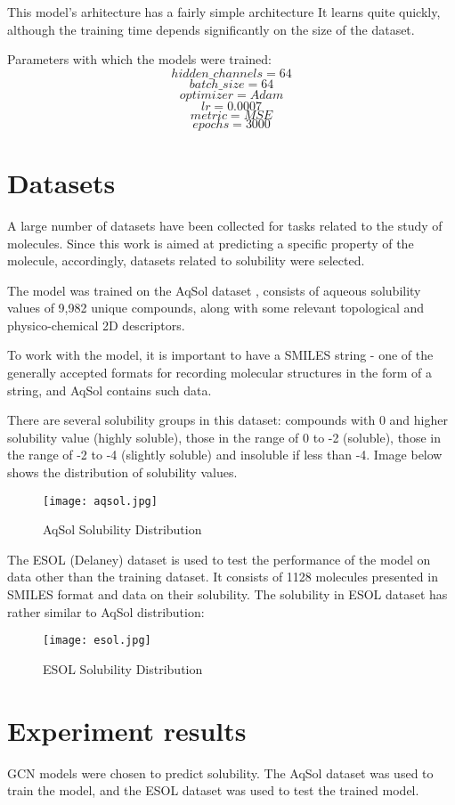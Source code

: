 \documentclass[a4paper,14pt]{article}
\begin{document}
This model's arhitecture has a fairly simple architecture It learns quite quickly, although the training time depends significantly on the size of the dataset.

Parameters with which the models were trained:
$$hidden\_channels = 64$$
$$batch\_size = 64$$
$$optimizer = Adam$$
$$lr = 0.0007$$
$$metric = MSE$$
$$epochs = 3000$$

\section{Datasets}
A large number of datasets have been collected for tasks related to the study of molecules. Since this work is aimed at predicting a specific property of the molecule, accordingly, datasets related to solubility were selected.

The model was trained on the AqSol dataset \cite{AqSol}, consists of aqueous solubility values of 9,982 unique compounds, along with some relevant topological and physico-chemical 2D descriptors. 

To work with the model, it is important to have a SMILES string - one of the generally accepted formats for recording molecular structures in the form of a string, and AqSol contains such data.

There are several solubility groups in this dataset: compounds with 0 and higher solubility value (highly soluble), those in the range of 0 to -2 (soluble), those in the range of -2 to -4 (slightly soluble) and insoluble if less than -4. Image below shows the distribution of solubility values.

\begin{figure}[H]
    \centering
    \texttt{[image: aqsol.jpg]}
    \caption{AqSol Solubility Distribution}
\end{figure}


The ESOL (Delaney) dataset \cite{ESOL} is used to test the performance of the model on data other than the training dataset. It consists of 1128 molecules presented in SMILES format and data on their solubility. The solubility in ESOL dataset has rather similar to AqSol distribution:

\begin{figure}[H]
    \centering
    \texttt{[image: esol.jpg]}
    \caption{ESOL Solubility Distribution}
\end{figure}

\section{Experiment results} 
GCN models were chosen to predict solubility. The AqSol dataset was used to train the model, and the ESOL dataset was used to test the trained model.
\end{document}
